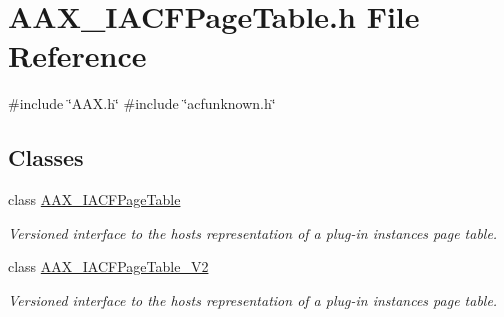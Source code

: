 \hypertarget{a00545}{}\section{A\+A\+X\+\_\+\+I\+A\+C\+F\+Page\+Table.\+h File Reference}
\label{a00545}
{\ttfamily \#include \char`\"{}A\+A\+X.\+h\char`\"{}}\newline
{\ttfamily \#include \char`\"{}acfunknown.\+h\char`\"{}}\newline
\subsection*{Classes}
\begin{DoxyCompactItemize}
\item 
class \mbox{\hyperlink{a01725}{A\+A\+X\+\_\+\+I\+A\+C\+F\+Page\+Table}}
\begin{DoxyCompactList}\small\item\em Versioned interface to the host\textquotesingle{}s representation of a plug-\/in instance\textquotesingle{}s page table. \end{DoxyCompactList}\item 
class \mbox{\hyperlink{a01729}{A\+A\+X\+\_\+\+I\+A\+C\+F\+Page\+Table\+\_\+\+V2}}
\begin{DoxyCompactList}\small\item\em Versioned interface to the host\textquotesingle{}s representation of a plug-\/in instance\textquotesingle{}s page table. \end{DoxyCompactList}\end{DoxyCompactItemize}
